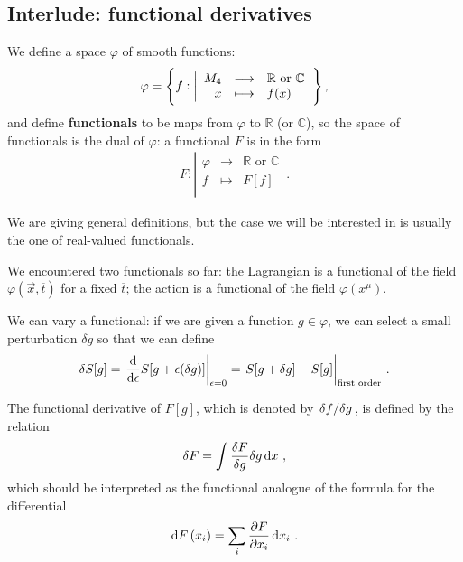 \documentclass[main.tex]{subfiles}
\begin{document}
\subsection{Interlude: functional derivatives}

We define a space \(\varphi \) of smooth functions: 
%
\begin{subequations}
\begin{align}
\varphi = \qty{
 f:
\left|
  \begin{array}{rcl}
    M_{4} & \longrightarrow & \mathbb{R} \text{ or } \mathbb{C} \\
    x & \longmapsto & f(x) \\
  \end{array}
\right.
}
\,,
\end{align}
\end{subequations}
%
and define \textbf{functionals} to be maps from \(\varphi \) to \(\mathbb{R}\) (or \(\mathbb{C}\)), so the space of functionals is the dual of \(\varphi \): a functional \(F\) is in the form
%
\begin{subequations}
\begin{align}
 F:
\left|
  \begin{array}{rcl}
    \varphi  & \longrightarrow & \mathbb{R} \text{ or } \mathbb{C}   \\
    f & \longmapsto & F[f] \\
  \end{array}
\right.
\,.
\end{align}
\end{subequations}

We are giving general definitions, but the case we will be interested in is usually the one of real-valued functionals.

We encountered two functionals so far: the Lagrangian is a functional of the field \(\varphi (\vec{x}, \overline{t})\) for a fixed \(\overline{t}\); the action is a functional of the field \(\varphi (x^{\mu })\).

We can vary a functional: if we are given a function \(g \in \varphi \), we can select a small perturbation \(\delta g\) so that we can define 
%
\begin{align}
\delta S[g] =  \eval{\dv{}{\epsilon } S[g + \epsilon (\delta g )]}_{\epsilon =0}
= \eval{S[g + \delta g] - S[g]}_{\text{first order}}
\,.
\end{align}

The functional derivative of \(F[g]\), which is denoted by \(\fdv*{f}{g}\), is defined by the relation 
%
\begin{align}
\delta F = \int \fdv{F}{g} \delta g \dd{x}
\,,
\end{align}
%
which should be interpreted as the functional analogue of the formula for the differential 
%
\begin{align}
\dd{F} (x_{i}) = \sum _{i} \pdv{F}{x_{i}} \dd{x_{i}} 
\,.
\end{align}
\end{document}

